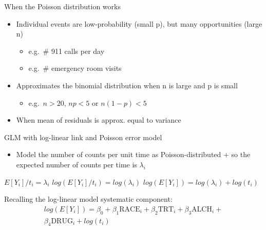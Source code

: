 \documentclass[
  ignorenonframetext,
]{beamer}
\providecommand{\tightlist}{%
  \setlength{\itemsep}{0pt}\setlength{\parskip}{0pt}}
\begin{document}
\begin{frame}{When the Poisson distribution works}
\protect\hypertarget{when-the-poisson-distribution-works}{}

\begin{itemize}
\tightlist
\item
  Individual events are low-probability (small p), but many
  opportunities (large n)

  \begin{itemize}
  \tightlist
  \item
    e.g.~\# 911 calls per day
  \item
    e.g.~\# emergency room visits
  \end{itemize}
\item
  Approximates the binomial distribution when n is large and p is small

  \begin{itemize}
  \tightlist
  \item
    e.g.~\(n > 20\), \(np < 5\) or \(n(1-p) < 5\)
  \end{itemize}
\item
  When mean of residuals is approx. equal to variance
\end{itemize}

\end{frame}

\begin{frame}{GLM with log-linear link and Poisson error model}
\protect\hypertarget{glm-with-log-linear-link-and-poisson-error-model}{}

\begin{itemize}
\tightlist
\item
  Model the number of counts per unit time as Poisson-distributed + so
  the expected number of counts per time is \(\lambda_i\)
\end{itemize}

\(E[Y_i]/t_i = \lambda_i\) \newline \(log(E[Y_i]/t_i) = log(\lambda_i)\)
\newline \(log(E[Y_i]) = log(\lambda_i) + log(t_i)\) \newline

Recalling the log-linear model systematic component: \[
\begin{aligned}
log(E[Y_i]) = \beta_0 + \beta_1 \textrm{RACE}_i + \beta_2 \textrm{TRT}_i + 
\beta_3 \textrm{ALCH}_i + \nonumber \\ \beta_4 \textrm{DRUG}_i + log(t_i)
\end{aligned}
\]

\end{frame}
\end{document}
